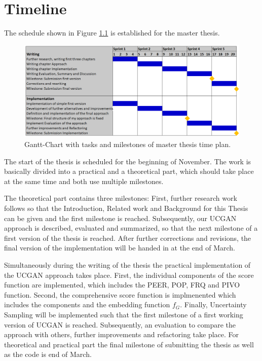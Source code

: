 \chapter{Timeline}
\label{ch:timeline}

The schedule shown in Figure \ref{fig:timeline} is established for the master thesis.
\begin{figure}
  \centering
    \includegraphics[width=\textwidth]{figures/gantt_chart.png}
  \caption{Gantt-Chart with tasks and milestones of master thesis time plan.}
  \label{fig:timeline}
\end{figure}
The start of the thesis is scheduled for the beginning of November.
The work is basically divided into a practical and a theoretical part, which should take place at the same time and both use multiple milestones.

The theoretical part contains three milestones:
First, further research work follows so that the Introduction, Related work and Background for this Thesis can be given and the first milestone is reached.
Subsequently, our \ac{UCGAN} approach is described, evaluated and summarized, so that the next milestone of a first version of the thesis is reached.
After further corrections and revisions, the final version of the implementation will be handed in at the end of March.

Simultaneously during the writing of the thesis the practical implementation of the \ac{UCGAN} approach takes place.
First, the individual components of the score function are implemented, which includes the \ac{PEER}, \ac{POP}, \ac{FRQ} and \ac{PIVO} function.
Second, the comprehensive score function is implmenented which includes the components and the embedding function $f_G$.
Finally, Uncertainty Sampling will be implemented such that the first milestone of a first working version of \ac{UCGAN} is reached.
Subsequently, an evaluation to compare the approach with others, further improvements and refactoring take place.
For theoretical and practical part the final milestone of submitting the thesis as well as the code is end of March.
